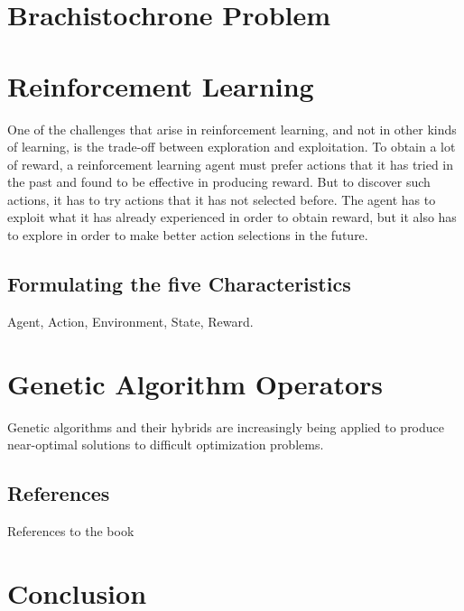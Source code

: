 \documentclass[a4paper, 10pt, twocolumn, twoside]{article}
\begin{document}
\section{Brachistochrone Problem}
\label{sec:BP}


\section{Reinforcement Learning}
\label{sec:RL}

One of the challenges that arise in reinforcement learning, and not in other kinds of learning, is the trade-off between exploration and exploitation. To obtain a lot of reward, a reinforcement learning agent must prefer actions that it has tried in the past and found to be effective in producing reward. But to discover such actions, it has to try actions that it has not selected before. The agent has to exploit what it has already experienced in order to obtain reward, but it also has to explore in order to make better action selections in the future.


\subsection{Formulating the five Characteristics}
\label{subsec:charac}

Agent, Action, Environment, State, Reward.



\section{Genetic Algorithm Operators}
\label{sec:GA}

Genetic algorithms and their hybrids are increasingly being applied to produce near-optimal solutions to difficult optimization problems. 






\subsection{References}

References to the book \cite{Book}


\section{Conclusion}
\label{sec:Conclusion}




\end{document}

